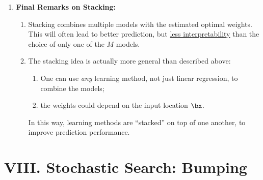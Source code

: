 \documentclass[12pt]{article}
\begin{document}
\begin{enumerate}[label=\textbf{\arabic*.}]
	\item \textbf{Final Remarks on Stacking:}
	\begin{enumerate}
		\item Stacking combines multiple models with the estimated optimal weights. This will often lead to better prediction, but \underline{less interpretability} than the choice of only one of the $M$ models. 
		\item The stacking idea is actually more general than described above: 
		\begin{enumerate}
			\item One can use \emph{any} learning method, not just linear regression, to combine the models; 
			\item the weights could depend on the input location $\bx$. 
		\end{enumerate}
		In this way, learning methods are ``stacked'' on top of one another, to improve prediction performance.
	\end{enumerate}

\end{enumerate}


\section*{VIII. Stochastic Search: Bumping}
\end{document}
